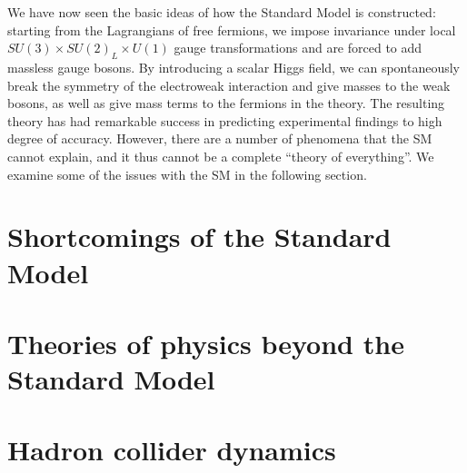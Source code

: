 We have now seen the basic ideas of how the Standard Model is constructed: starting from the Lagrangians
of free fermions, we impose invariance under local $SU(3)\times SU(2)_L\times U(1)$ gauge transformations
and are forced to add massless gauge bosons. By introducing a scalar Higgs field, we can spontaneously 
break the symmetry of the electroweak interaction and give masses to the weak bosons, as well as
give mass terms to the fermions in the theory. The resulting theory has had remarkable success in
predicting experimental findings to high degree of accuracy. However, there are a number of phenomena
that the SM cannot explain, and it thus cannot be a complete ``theory of everything''. We examine some
of the issues with the SM in the following section.


\section{Shortcomings of the Standard Model}



\section{Theories of physics beyond the Standard Model}
\label{sec:bsm}

\section{Hadron collider dynamics}
\label{sec:bsm}
